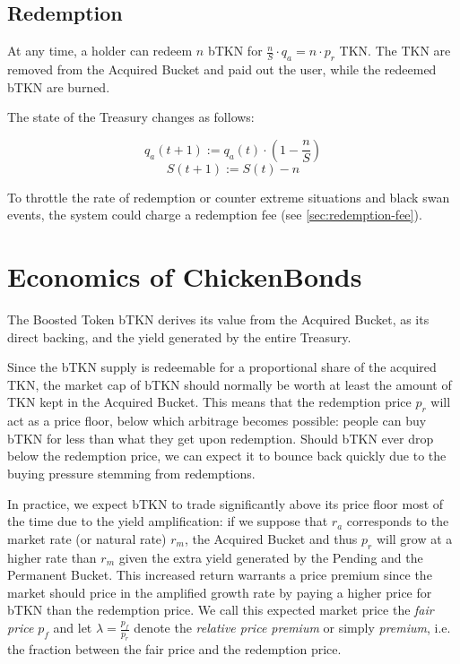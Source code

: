 \documentclass{article}
\begin{document}
\subsection{Redemption}
\label{sec:redemption}
At any time, a holder can redeem $n$ bTKN for $\frac{n}{S}\cdot q_a = n \cdot p_r$ TKN.
The TKN are removed from the Acquired Bucket and paid out the user, while the redeemed bTKN are burned.

The state of the Treasury changes as follows: 

\begin{equation}
  \label{eq:redemption-qa}
    q_a(t+1) := q_a(t) \cdot (1 - \frac{n}{S})
\end{equation}
\begin{equation}
  \label{eq:redemption-S}
    S(t+1) := S(t) - n
\end{equation}

To throttle the rate of redemption or counter extreme situations and black swan events, the system could charge a redemption fee (see \ref{sec:redemption-fee}).

\section{Economics of ChickenBonds}
 \label{sec:economics}
The Boosted Token bTKN derives its value from the Acquired Bucket, as its direct backing, and the yield generated by the entire Treasury.

Since the bTKN supply is redeemable for a proportional share of the acquired TKN, the market cap of bTKN should normally be worth at least the amount of TKN kept in the Acquired Bucket. This means that the redemption price $p_r$ will act as a price floor, below which arbitrage becomes possible: people can buy bTKN for less than what they get upon redemption. Should bTKN ever drop below the redemption price, we can expect it to bounce back quickly due to the buying pressure stemming from redemptions.

In practice, we expect bTKN to trade significantly above its price floor most of the time due to the yield amplification: if we suppose that $r_a$ corresponds to the market rate (or natural rate) $r_m$, the Acquired Bucket and thus $p_r$ will grow at a higher rate than $r_m$ given the extra yield generated by the Pending and the Permanent Bucket. This increased return warrants a price premium since the market should price in the amplified growth rate by paying a higher price for bTKN than the redemption price. We call this expected market price the \textit{fair price} $p_f$ and let $\lambda = \frac{p_f}{p_r}$ denote the \textit{relative price premium} or simply \textit{premium}, i.e. the fraction between the fair price and the redemption price.
\end{document}
